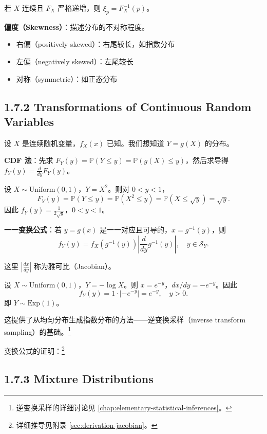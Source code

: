 若 $X$ 连续且 $F_X$ 严格递增，则 $\xi_p = F_X^{-1}(p)$。

\textbf{偏度（Skewness）}：描述分布的不对称程度。
\begin{itemize}
    \item 右偏（positively skewed）：右尾较长，如指数分布
    \item 左偏（negatively skewed）：左尾较长
    \item 对称（symmetric）：如正态分布
\end{itemize}

\subsection{1.7.2 Transformations of Continuous Random Variables}

设 $X$ 是连续随机变量，$f_X(x)$ 已知。我们想知道 $Y = g(X)$ 的分布。

\textbf{CDF 法}：先求 $F_Y(y) = \mathbb{P}(Y \leq y) = \mathbb{P}(g(X) \leq y)$，然后求导得 $f_Y(y) = \frac{d}{dy} F_Y(y)$。

\begin{example}[连续变换]\label{ex:continuous-transform-ch1}
设 $X \sim \text{Uniform}(0, 1)$，$Y = X^2$。则对 $0 < y < 1$，
\[
F_Y(y) = \mathbb{P}(Y \leq y) = \mathbb{P}(X^2 \leq y) = \mathbb{P}(X \leq \sqrt{y}) = \sqrt{y}.
\]
因此 $f_Y(y) = \frac{1}{2\sqrt{y}}$，$0 < y < 1$。
\end{example}

\textbf{一一变换公式}：若 $y = g(x)$ 是一一对应且可导的，$x = g^{-1}(y)$，则
\[
f_Y(y) = f_X(g^{-1}(y)) \left| \frac{d}{dy} g^{-1}(y) \right|, \quad y \in \mathcal{S}_Y.
\label{eq:one-to-one-transform-ch1}
\]

这里 $|\frac{dx}{dy}|$ 称为雅可比（Jacobian）。

\begin{example}[对数变换]\label{ex:log-transform-ch1}
设 $X \sim \text{Uniform}(0, 1)$，$Y = -\log X$。则 $x = e^{-y}$，$dx/dy = -e^{-y}$。因此
\[
f_Y(y) = 1 \cdot |-e^{-y}| = e^{-y}, \quad y > 0.
\]
即 $Y \sim \text{Exp}(1)$。

这提供了从均匀分布生成指数分布的方法——逆变换采样（inverse transform sampling）的基础。\footnote{逆变换采样的详细讨论见 \cref{chap:elementary-statistical-inferences}。}
\end{example}

变换公式的证明：\footnote{详细推导见附录 \cref{sec:derivation-jacobian}。}

\subsection{1.7.3 Mixture Distributions}

